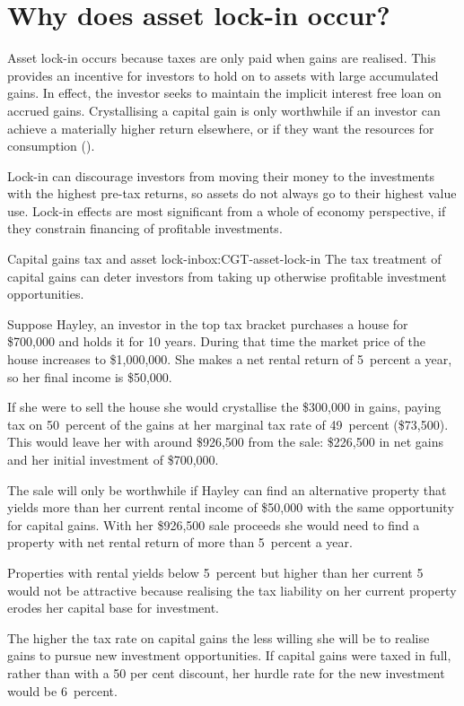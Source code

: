 \documentclass{grattan}\usepackage[]{graphicx}\usepackage[]{color}
\begin{document}
\section{Why does asset lock-in occur?}
Asset lock-in occurs because taxes are only paid when gains are realised. This provides an incentive for investors to hold on to assets with large accumulated gains.  In effect, the investor seeks to maintain the implicit interest free loan on accrued gains. Crystallising a capital gain is only worthwhile if an investor can achieve a materially higher return elsewhere, or if they want the resources for consumption ().   

Lock-in can discourage investors from moving their money to the investments with the highest pre-tax returns, so assets do not always go to their highest value use.  Lock-in effects are most significant from a whole of economy perspective, if they constrain financing of profitable investments.  

\begin{smallbox}[!htbp]{Capital gains tax and asset lock-in}{box:CGT-asset-lock-in}
The tax treatment of capital gains can deter investors from taking up otherwise profitable investment opportunities. 



Suppose Hayley, an investor in the top tax bracket purchases a house for \$700,000 and holds it for 10 years. During that time the market price of the house increases to \$1,000,000. She makes a net rental return of 5~percent a year, so her  final income is \$50,000. 

If she were to sell the house she would crystallise the \$300,000 in gains, paying tax on 50~percent of the gains at her marginal tax rate of 49~percent (\$73,500). This would leave her with around \$926,500 from the sale: \$226,500 in net gains and her initial investment of \$700,000. 

The sale will only be worthwhile if Hayley can find an alternative property that yields more than her current rental income of \$50,000  with the same opportunity for capital gains. With her \$926,500 sale proceeds she would need to find a property with net rental return of more than 5~percent a year. 

Properties with rental yields below 5~percent but higher than her current 5 would not be attractive because realising the tax liability on her current property erodes her capital base for investment.  

The higher the tax rate on capital gains the less willing she will be to realise gains to pursue new investment opportunities. If capital gains were taxed in full, rather than with a 50 per cent discount, her hurdle rate for the new investment would be 6~percent.
\end{smallbox}
\end{document}
